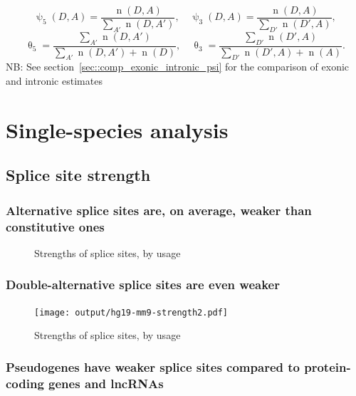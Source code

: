 \documentclass{article}
\DeclareMathOperator{\nn}{n}
\DeclareMathOperator{\ii}{\psi}
\DeclareMathOperator{\cc}{\theta}
\begin{document}
$$\ii_5(D,A)=\frac{\nn(D,A)}{\sum\limits_{A'}\nn(D,A')},\quad
\ii_3(D,A)=\frac{\nn(D,A)}{\sum\limits_{D'}\nn(D',A)},\label{eq::psi::eq03}$$
$$\cc_5=\frac{\sum\limits_{A'}\nn(D,A')}{\sum\limits_{A'}\nn(D,A')+\nn(D)},\quad
\cc_3=\frac{\sum\limits_{D'}\nn(D',A)}{\sum\limits_{D'}\nn(D',A)+\nn(A)}.\label{eq::psi::eq05}$$
NB: See section~\ref{sec::comp_exonic_intronic_psi} for the comparison of exonic and intronic estimates

\clearpage


\section{Single-species analysis}
\subsection{Splice site strength}
\subsubsection{Alternative splice sites are, on average, weaker than constitutive ones}
\begin{figure}[h!]
\begin{center}
%
%
\caption{Strengths of splice sites, by usage }
\end{center}
\end{figure}
\clearpage

\subsubsection{Double-alternative splice sites are even weaker}
\begin{figure}[h!]
\begin{center}
\texttt{[image: output/hg19-mm9-strength2.pdf]}
\caption{Strengths of splice sites, by usage}
\end{center}
\end{figure}
\clearpage

\subsubsection{Pseudogenes have weaker splice sites compared to protein-coding genes and lncRNAs}
\end{document}
